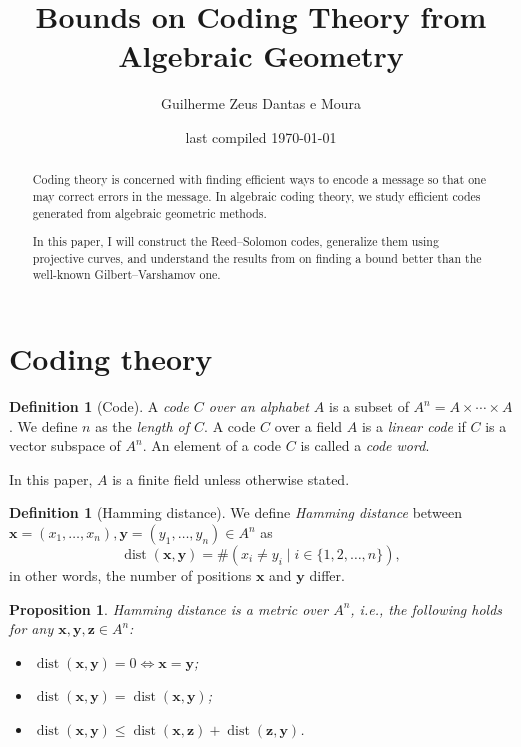 \documentclass[11pt, letterpaper]{amsart}
\title{Bounds on Coding Theory from Algebraic Geometry}
\author{Guilherme Zeus Dantas e Moura}
\date{last compiled \today}
\newtheorem{prop}[thm]{Proposition}
\theoremstyle{definition}
\newtheorem{defn}[]{Definition}
\DeclareMathOperator{\dist}{dist}
\begin{document}
\maketitle
\begin{abstract}    
    Coding theory is concerned with finding efficient ways to encode a message so that one may correct errors in the message. In algebraic coding theory, we study efficient codes generated from algebraic geometric methods.
    
    In this paper, I will construct the Reed--Solomon codes, generalize them using projective curves, and understand the results from \cite{TVZ82} on finding a bound better than the well-known Gilbert--Varshamov one.
\end{abstract} 


\section{Coding theory} \label{s:codingtheory}

\begin{defn}[Code]
    A \emph{code $C$ over an alphabet $A$} is a subset of $A^n = A \times \cdots \times A$.
    We define $n$ as the \emph{length of $C$}.
    A code $C$ over a field $A$ is a \emph{linear code} if $C$ is a vector subspace of $A^n$. An element of a code $C$ is called a \emph{code word}.
\end{defn}

In this paper, $A$ is a finite field unless otherwise stated.

\begin{defn}[Hamming distance]
    We define \emph{Hamming distance} between $\mathbf{x} = (x_1, \dots, x_n), \mathbf{y} = (y_1, \dots, y_n) \in A^n$ as
    \[ \dist(\mathbf{x}, \mathbf{y}) = \#\left( x_i \neq y_i \mid i \in \{1, 2, \dots, n\} \right),\]
    in other words, the number of positions $\mathbf{x}$ and $\mathbf{y}$ differ.
\end{defn}

\begin{prop}
    Hamming distance is a metric over $A^n$, i.e., the following holds for any $\mathbf{x}, \mathbf{y}, \mathbf{z} \in A^n$:
    \begin{itemize}[noitemsep]
        \item $\dist(\mathbf{x}, \mathbf{y}) = 0 \iff \mathbf{x} = \mathbf{y}$;
        \item $\dist(\mathbf{x}, \mathbf{y}) = \dist(\mathbf{x}, \mathbf{y})$;
        \item $\dist(\mathbf{x}, \mathbf{y}) \le \dist(\mathbf{x}, \mathbf{z}) + \dist(\mathbf{z}, \mathbf{y})$.
    \end{itemize}
\end{prop}
\end{document}
